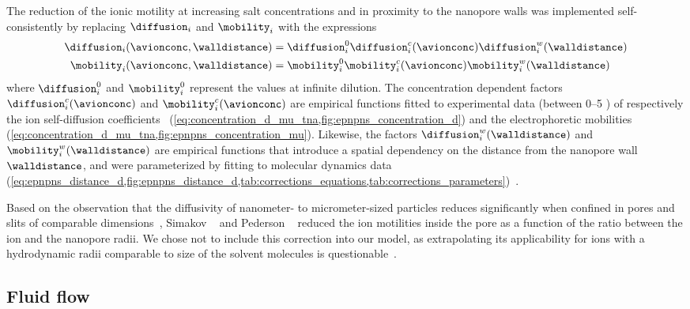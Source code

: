 The reduction of the ionic motility at increasing salt concentrations and in proximity to the nanopore walls
was implemented self-consistently by replacing $\diffusion_{i}$ and $\mobility_{i}$ with the expressions
%
\begin{align}\label{eq:epnp-ns_diffusion_and_mobility}
  \diffusion_{i}(\avionconc,\walldistance) ={}&
      \diffusion_{i}^0 \diffusion_{i}^c(\avionconc) \diffusion_{i}^w(\walldistance)  \\
  \mobility_{i}(\avionconc,\walldistance) ={}&
      \mobility_{i}^0 \mobility_{i}^c(\avionconc) \mobility_{i}^w(\walldistance)
\end{align}
%
where $\diffusion_{i}^0$ and $\mobility_{i}^0$ represent the values at infinite dilution. The concentration
dependent factors $\diffusion_{i}^c(\avionconc)$ and $\mobility_{i}^c(\avionconc)$ are empirical functions
fitted to experimental data (between \SIrange{0}{5}{\Molar} ) of respectively the ion self-diffusion
coefficients~\cite{Mills-1989} (\cref{eq:concentration_d_mu_tna,fig:epnpns_concentration_d}) and the
electrophoretic mobilities~\cite{Bianchi-1989,Currie-1960,Goldsack-1976,DellaMonica-1979}
(\cref{eq:concentration_d_mu_tna,fig:epnpns_concentration_mu}). Likewise, the factors
$\diffusion_{i}^w(\walldistance)$ and $\mobility_{i}^w(\walldistance)$ are empirical functions that introduce
a spatial dependency on the distance from the nanopore wall $\walldistance$, and were parameterized by fitting
to molecular dynamics data
(\cref{eq:epnpns_distance_d,fig:epnpns_distance_d,tab:corrections_equations,tab:corrections_parameters})~\cite{Noskov-2004,Simakov-2010,Makarov-1998,Wilson-2019}.

Based on the observation that the diffusivity of nanometer- to micrometer-sized particles reduces
significantly when confined in pores and slits of comparable dimensions~\cite{Renkin-1954,Deen-1987,
Dechadilok-2006,Muthukumar-2014,Kannam-2017}, Simakov \etal{}~\cite{Simakov-2010} and Pederson
\etal{}~\cite{Pederson-2015} reduced the ion motilities inside the pore as a function of the ratio between the
ion and the nanopore radii. We chose not to include this correction into our model, as extrapolating its
applicability for ions with a hydrodynamic radii comparable to size of the solvent molecules is
questionable~\cite{Anderson-1972,Deen-1987}.


\subsection{Fluid flow}
%

